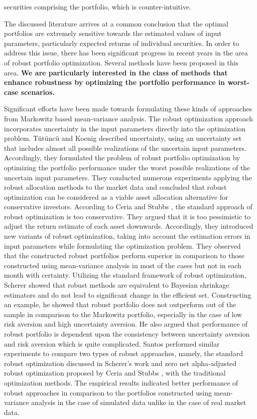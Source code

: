 \documentclass[12pt]{article}
\numberwithin{equation}{section}
\begin{document}
securities comprising the portfolio, which is counter-intuitive.

The discussed literature arrives at a common conclusion that the optimal portfolios are extremely sensitive towards the estimated values of input parameters, particularly expected returns of individual securities. In order to address this issue, there has been significant progress in recent years in the area of robust portfolio optimization. Several methods have been proposed in this area. \textbf{We are particularly interested in the class of methods that enhance robustness by optimizing the portfolio performance in worst-case scenarios.} 

Significant efforts have been made towards formulating these kinds of approaches from Markowitz based mean-variance analysis. The robust optimization approach incorporates uncertainty in the input parameters directly into the optimization problem. T{\"u}t{\"u}nc{\"u} and Koenig \cite{tutuncu} described uncertainty, using an uncertainty set that includes almost all possible realizations of the uncertain input parameters. Accordingly, they formulated the problem of robust portfolio optimization by optimizing the portfolio performance under the worst possible realizations of the uncertain input parameters. They conducted numerous experiments applying the robust allocation methods to the market data and concluded that robust optimization can be considered as a viable asset allocation alternative for conservative investors.
According to Ceria and Stubbs \cite{Ceria}, the standard approach of robust optimization is too conservative. They argued that it is too pessimistic to adjust
the return estimate of each asset downwards. Accordingly, they introduced new variants of robust optimization, taking into account the estimation errors in input parameters while formulating the optimization problem. They observed that the constructed robust portfolios perform superior in comparison to those constructed using mean-variance analysis in most of the cases but not in each month with certainty. Utilizing the standard framework of robust optimization, Scherer \cite{Scherer} showed that robust methods are equivalent to Bayesian shrinkage estimators and do not lead to significant change in the efficient set. Constructing an example, he showed that robust portfolio does not outperform out of the sample in comparison to the Markowitz portfolio, especially in the case of low risk aversion and high uncertainty aversion. He also argued that performance of robust portfolio is dependent upon the consistency between uncertainty aversion and risk aversion which is quite complicated. Santos \cite{santos} performed similar experiments to compare two types of robust approaches, namely, the standard robust optimization discussed in Scherer's work \cite{Scherer} and zero net alpha-adjusted robust optimization proposed by Ceria and Stubbs \cite{Ceria}, with the traditional optimization methods. The empirical results indicated better performance of robust approaches in comparison to the portfolios constructed using mean-variance analysis in the case of simulated data unlike in the case of real market data. 
\end{document}
